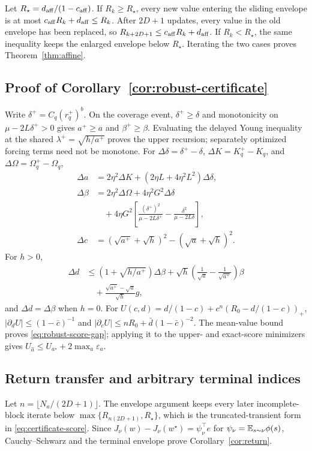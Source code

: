 Let $R_\star=d_{\rm aff}/(1-c_{\rm aff})$.
If $R_k\ge R_\star$, every new value entering the sliding envelope is at most $c_{\rm aff}R_k+d_{\rm aff}\le R_k$.
After $2D+1$ updates, every value in the old envelope has been replaced, so $R_{k+2D+1}\le c_{\rm aff}R_k+d_{\rm aff}$.
If $R_k<R_\star$, the same inequality keeps the enlarged envelope below $R_\star$.
Iterating the two cases proves Theorem~\ref{thm:affine}.

\subsection{Proof of Corollary~\ref{cor:robust-certificate}}
Write $\delta^+=C_q(r_q^+)^b$.
On the coverage event, $\delta^+\ge\delta$ and monotonicity on $\mu-2L\delta^+>0$ gives $a^+\ge a$ and $\beta^+\ge\beta$.
Evaluating the delayed Young inequality at the shared $\lambda^+=\sqrt{h/a^+}$ proves the upper recursion; separately optimized forcing terms need not be monotone.
For $\Delta\delta=\delta^+-\delta$, $\Delta K=K_q^+-K_q$, and $\Delta\Omega=\Omega_q^+-\Omega_q$,
\begin{align}
\Delta a
&=2\eta^2\Delta K+(2\eta L+4\eta^2L^2)\Delta\delta,\nonumber\\
\Delta\beta
&=2\eta^2\Delta\Omega+4\eta^2G^2\Delta\delta\nonumber\\
&\quad+4\eta G^2\left[
\frac{(\delta^+)^2}{\mu-2L\delta^+}
-\frac{\delta^2}{\mu-2L\delta}
\right],\nonumber\\
\Delta c
&=(\sqrt{a^+}+\sqrt h)^2-(\sqrt a+\sqrt h)^2.
\label{eq:certificate-perturbations}
\end{align}
For $h>0$,
\begin{align}
\Delta d
&\le(1+\sqrt{h/a^+})\Delta\beta
+\sqrt h\left(\frac1{\sqrt a}-\frac1{\sqrt{a^+}}\right)\beta\nonumber\\
&\quad+\frac{\sqrt{a^+}-\sqrt a}{\sqrt h}g,
\label{eq:certificate-delta-d}
\end{align}
and $\Delta d=\Delta\beta$ when $h=0$.
For $U(c,d)=d/(1-c)+c^n(R_0-d/(1-c))_+$, $|\partial_dU|\le(1-\bar c)^{-1}$ and $|\partial_cU|\le nR_0+\bar d(1-\bar c)^{-2}$.
The mean-value bound proves \eqref{eq:robust-score-gap}; applying it to the upper- and exact-score minimizers gives $U_{\widehat a}\le U_{a^\star}+2\max_a\varepsilon_a$.

\subsection{Return transfer and arbitrary terminal indices}
Let $n=\lfloor N_a/(2D+1)\rfloor$.
The envelope argument keeps every later incomplete-block iterate below $\max\{R_{n(2D+1)},R_\star\}$, which is the truncated-transient form in \eqref{eq:certificate-score}.
Since $J_\nu(w)-J_\nu(w^\star)=\psi_\nu^\top e$ for $\psi_\nu=\mathbb{E}_{s\sim\nu}\phi(s)$, Cauchy--Schwarz and the terminal envelope prove Corollary~\ref{cor:return}.

